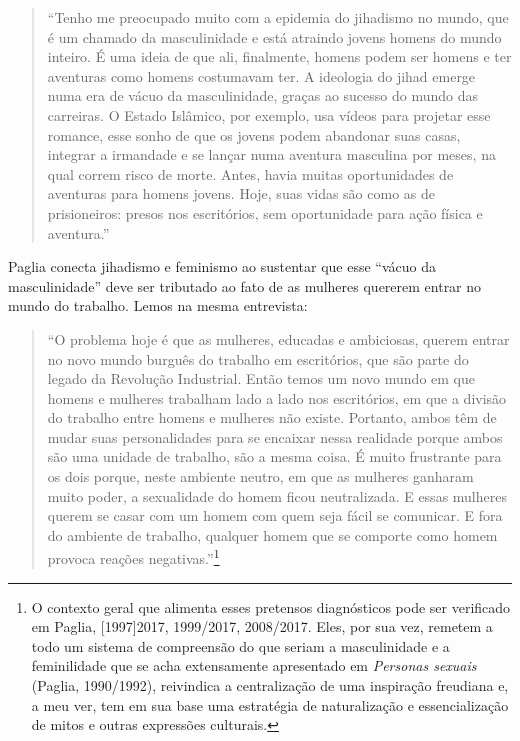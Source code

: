 \begin{quote}
``Tenho me preocupado muito com a epidemia do jihadismo no mundo, que é
um chamado da masculinidade e está atraindo jovens homens do mundo
inteiro. É uma ideia de que ali, finalmente, homens podem ser homens e
ter aventuras como homens costumavam ter. A ideologia do jihad emerge
numa era de vácuo da masculinidade, graças ao sucesso do mundo das
carreiras. O Estado Islâmico, por exemplo, usa vídeos para projetar esse
romance, esse sonho de que os jovens podem abandonar suas casas,
integrar a irmandade e se lançar numa aventura masculina por meses, na
qual correm risco de morte. Antes, havia muitas oportunidades de
aventuras para homens jovens. Hoje, suas vidas são como as de
prisioneiros: presos nos escritórios, sem oportunidade para ação física
e aventura.''
\end{quote}

Paglia conecta jihadismo e feminismo ao sustentar que esse ``vácuo da
masculinidade'' deve ser tributado ao fato de as mulheres quererem
entrar no mundo do trabalho. Lemos na mesma entrevista:

\begin{quote}
``O problema hoje é que as mulheres, educadas e ambiciosas, querem
entrar no novo mundo burguês do trabalho em escritórios, que são parte
do legado da Revolução Industrial. Então temos um novo mundo em que
homens e mulheres trabalham lado a lado nos escritórios, em que a
divisão do trabalho entre homens e mulheres não existe. Portanto, ambos
têm de mudar suas personalidades para se encaixar nessa realidade porque
ambos são uma unidade de trabalho, são a mesma coisa. É muito frustrante
para os dois porque, neste ambiente neutro, em que as mulheres ganharam
muito poder, a sexualidade do homem ficou neutralizada. E essas mulheres
querem se casar com um homem com quem seja fácil se comunicar. E fora do
ambiente de trabalho, qualquer homem que se comporte como homem provoca
reações negativas.''\footnote{O contexto geral que alimenta esses
  pretensos diagnósticos pode ser verificado em Paglia, {[}1997{]}2017,
  1999/2017, 2008/2017. Eles, por sua vez, remetem a todo um sistema de
  compreensão do que seriam a masculinidade e a feminilidade que se acha
  extensamente apresentado em \emph{Personas sexuais} (Paglia,
  1990/1992), reivindica a centralização de uma inspiração freudiana e,
  a meu ver, tem em sua base uma estratégia de naturalização e
  essencialização de mitos e outras expressões culturais.}
\end{quote}

